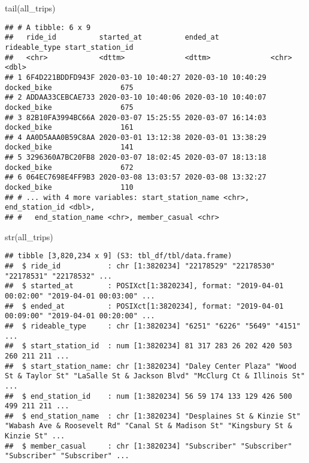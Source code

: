 \documentclass[
]{article}
\newenvironment{Shaded}{\begin{snugshade}}{\end{snugshade}}
\newcommand{\FunctionTok}[1]{\textcolor[rgb]{0.00,0.00,0.00}{#1}}
\newcommand{\NormalTok}[1]{#1}
\begin{document}
\begin{Shaded}
\begin{Highlighting}[]
\FunctionTok{tail}\NormalTok{(all\_trips)}
\end{Highlighting}
\end{Shaded}

\begin{verbatim}
## # A tibble: 6 x 9
##   ride_id          started_at          ended_at            rideable_type start_station_id
##   <chr>            <dttm>              <dttm>              <chr>                    <dbl>
## 1 6F4D221BDDFD943F 2020-03-10 10:40:27 2020-03-10 10:40:29 docked_bike                675
## 2 ADDAA33CEBCAE733 2020-03-10 10:40:06 2020-03-10 10:40:07 docked_bike                675
## 3 82B10FA3994BC66A 2020-03-07 15:25:55 2020-03-07 16:14:03 docked_bike                161
## 4 AA0D5AAA0B59C8AA 2020-03-01 13:12:38 2020-03-01 13:38:29 docked_bike                141
## 5 3296360A7BC20FB8 2020-03-07 18:02:45 2020-03-07 18:13:18 docked_bike                672
## 6 064EC7698E4FF9B3 2020-03-08 13:03:57 2020-03-08 13:32:27 docked_bike                110
## # ... with 4 more variables: start_station_name <chr>, end_station_id <dbl>,
## #   end_station_name <chr>, member_casual <chr>
\end{verbatim}

\begin{Shaded}
\begin{Highlighting}[]
\FunctionTok{str}\NormalTok{(all\_trips)}
\end{Highlighting}
\end{Shaded}

\begin{verbatim}
## tibble [3,820,234 x 9] (S3: tbl_df/tbl/data.frame)
##  $ ride_id           : chr [1:3820234] "22178529" "22178530" "22178531" "22178532" ...
##  $ started_at        : POSIXct[1:3820234], format: "2019-04-01 00:02:00" "2019-04-01 00:03:00" ...
##  $ ended_at          : POSIXct[1:3820234], format: "2019-04-01 00:09:00" "2019-04-01 00:20:00" ...
##  $ rideable_type     : chr [1:3820234] "6251" "6226" "5649" "4151" ...
##  $ start_station_id  : num [1:3820234] 81 317 283 26 202 420 503 260 211 211 ...
##  $ start_station_name: chr [1:3820234] "Daley Center Plaza" "Wood St & Taylor St" "LaSalle St & Jackson Blvd" "McClurg Ct & Illinois St" ...
##  $ end_station_id    : num [1:3820234] 56 59 174 133 129 426 500 499 211 211 ...
##  $ end_station_name  : chr [1:3820234] "Desplaines St & Kinzie St" "Wabash Ave & Roosevelt Rd" "Canal St & Madison St" "Kingsbury St & Kinzie St" ...
##  $ member_casual     : chr [1:3820234] "Subscriber" "Subscriber" "Subscriber" "Subscriber" ...
\end{verbatim}
\end{document}
